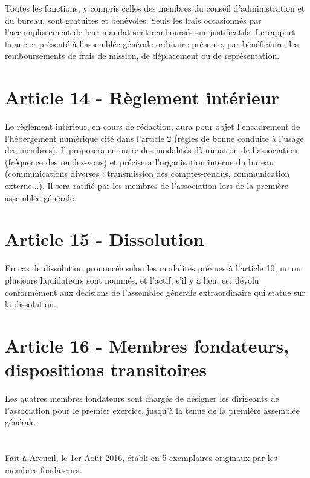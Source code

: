 \documentclass[a4paper,oneside,10pt]{article}
\begin{document}
Toutes les fonctions, y compris celles des membres du conseil d'administration et du bureau, sont gratuites et bénévoles. Seuls les frais occasionnés par l'accomplissement de leur mandat sont remboursés sur justificatifs. Le rapport financier présenté à l'assemblée générale ordinaire présente, par bénéficiaire, les remboursements de frais de mission, de déplacement ou de représentation.

\section*{Article 14 - Règlement intérieur}

Le règlement intérieur, en cours de rédaction, aura pour objet l'encadrement de l'hébergement numérique cité dans l'article 2 (règles de bonne conduite à l'usage des membres). Il proposera en outre des modalités d'animation de l'association (fréquence des rendez-vous) et précisera l'organisation interne du bureau (communications diverses : transmission des comptes-rendus, communication externe...). Il sera ratifié par les membres de l'association lors de la première assemblée générale.

\section*{Article 15 - Dissolution}

En cas de dissolution prononcée selon les modalités prévues à l'article 10, un ou plusieurs liquidateurs sont nommés, et l'actif, s'il y a lieu, est dévolu conformément aux décisions de l'assemblée générale extraordinaire qui statue sur la dissolution.

\section*{Article 16 - Membres fondateurs, dispositions transitoires}

Les quatres membres fondateurs sont chargés de désigner les dirigeants de l'association pour le premier exercice, jusqu'à la tenue de la première assemblée générale.

\section*{}

Fait à Arcueil, le 1er Août 2016, établi en 5 exemplaires originaux par les membres fondateurs.
\end{document}
